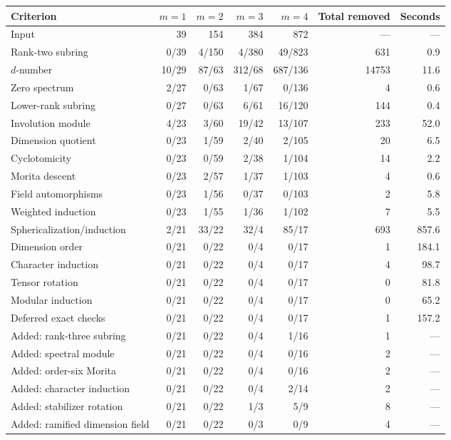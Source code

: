 \begin{table}[p]\centering\small
\setlength{\tabcolsep}{3pt}
\begin{tabular*}{\textwidth}{@{\extracolsep{\fill}}lrrrrrr@{}}\toprule
Criterion & $m=1$ & $m=2$ & $m=3$ & $m=4$ & Total removed & Seconds\\\midrule
Input & 39 & 154 & 384 & 872 & --- & ---\\
Rank-two subring & 0/39 & 4/150 & 4/380 & 49/823 & 631 & 0.9\\
$d$-number & 10/29 & 87/63 & 312/68 & 687/136 & 14753 & 11.6\\
Zero spectrum & 2/27 & 0/63 & 1/67 & 0/136 & 4 & 0.6\\
Lower-rank subring & 0/27 & 0/63 & 6/61 & 16/120 & 144 & 0.4\\
Involution module & 4/23 & 3/60 & 19/42 & 13/107 & 233 & 52.0\\
Dimension quotient & 0/23 & 1/59 & 2/40 & 2/105 & 20 & 6.5\\
Cyclotomicity & 0/23 & 0/59 & 2/38 & 1/104 & 14 & 2.2\\
Morita descent & 0/23 & 2/57 & 1/37 & 1/103 & 4 & 0.6\\
Field automorphisms & 0/23 & 1/56 & 0/37 & 0/103 & 2 & 5.8\\
Weighted induction & 0/23 & 1/55 & 1/36 & 1/102 & 7 & 5.5\\
Sphericalization/induction & 2/21 & 33/22 & 32/4 & 85/17 & 693 & 857.6\\
Dimension order & 0/21 & 0/22 & 0/4 & 0/17 & 1 & 184.1\\
Character induction & 0/21 & 0/22 & 0/4 & 0/17 & 4 & 98.7\\
Tensor rotation & 0/21 & 0/22 & 0/4 & 0/17 & 0 & 81.8\\
Modular induction & 0/21 & 0/22 & 0/4 & 0/17 & 0 & 65.2\\
Deferred exact checks & 0/21 & 0/22 & 0/4 & 0/17 & 1 & 157.2\\
Added: rank-three subring & 0/21 & 0/22 & 0/4 & 1/16 & 1 & ---\\
Added: spectral module & 0/21 & 0/22 & 0/4 & 0/16 & 2 & ---\\
Added: order-six Morita & 0/21 & 0/22 & 0/4 & 0/16 & 2 & ---\\
Added: character induction & 0/21 & 0/22 & 0/4 & 2/14 & 2 & ---\\
Added: stabilizer rotation & 0/21 & 0/22 & 1/3 & 5/9 & 8 & ---\\
Added: ramified dimension field & 0/21 & 0/22 & 0/3 & 0/9 & 4 & ---\\

\end{tabular*}
\end{table}
